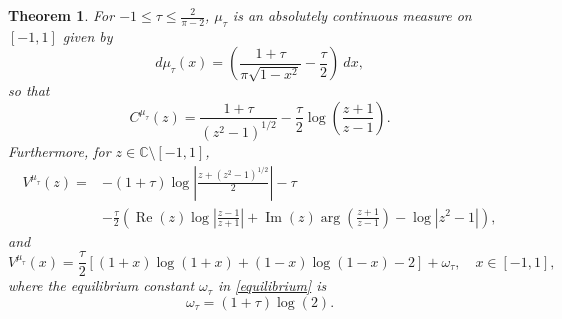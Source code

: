 \documentclass[10pt,a4paper]{amsart}
\newtheorem{theorem}{Theorem}
\newcommand{\C}{\mathbb{C}}
\begin{document}
\begin{theorem}\label{theorem_case_-1<=tau<=2/(pi-2)}
    For $-1\leq\tau\leq\frac{2}{\pi-2}$, $\mu_\tau$ is an absolutely continuous measure on $[-1,1]$ given by
    \begin{equation}\label{mu_when_-1<=tau_<=/(pi-2)}
        d\mu_\tau(x)=\left(\frac{1+\tau}{\pi\sqrt{1-x^2}}-\frac{\tau}{2}\right)\ dx,
    \end{equation}
so that
\begin{equation}\label{Cauchy_Transform_mu_when_-1<=tau_<=/(pi-2)}
        C^{\mu_\tau}(z)= \frac{1+\tau}{\left( z^2-1\right)^{1/2}}-\frac{\tau}{2}\log\left(\frac{z+1}{z-1}\right).
    \end{equation}
Furthermore, for $z\in \C\setminus [-1,1]$,  
\begin{equation*}
\begin{split}
        V^{\mu_\tau}(z)= & -(1+\tau)\log\left|\frac{z+\left( z^2-1\right)^{1/2}}{2}\right|-\tau  \\
        & -\frac{\tau}{2}\left(\operatorname{Re}(z)\log\left|\frac{z-1}{z+1}\right|+\operatorname{Im}(z)\arg\left(\frac{z+1}{z-1}\right)-\log|z^2-1|\right),
\end{split}
    \end{equation*}
and
\begin{equation}\label{Log_Potential_mu_when_-1<=tau_<=/(pi-2)_[-1,1]}
    V^{\mu_\tau}(x)=\frac{\tau}{2} \left[ (1+x)\log(1+x)+ (1-x)\log(1-x) -2 \right] + \omega_\tau, \quad x\in   [-1,1],
\end{equation}
where the equilibrium constant $\omega_\tau$ in \eqref{equilibrium} is  
\begin{equation}\label{equilibrium_constant_-1<=tau<=2/(pi-2)}
    \omega_\tau=(1+\tau)\log(2).
\end{equation}
\end{theorem}
\end{document}
